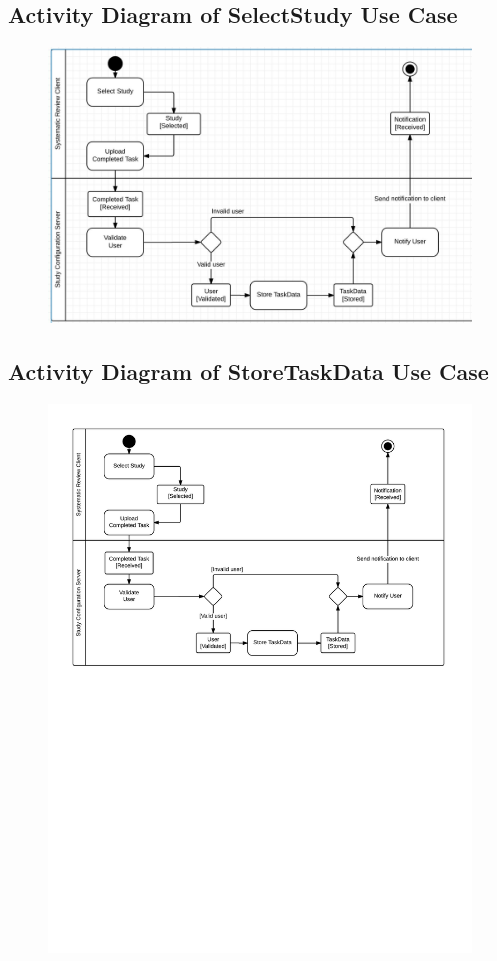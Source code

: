 \subsection{ Activity Diagram of SelectStudy Use Case}
\begin{figure}[H]
  \includegraphics[width=45em]{section/DynamicModel/Activity_Diagram_Select_Study}
  \label{fig: Activity Diagram of SelectStudy Use Case}
\end{figure}

\subsection{ Activity Diagram of StoreTaskData Use Case}
\begin{figure}[H]
  \includegraphics[width=45em]{section/DynamicModel/Activity_Diagram_StoreTaskData}
  \label{fig: Activity Diagram of StoreTaskData Use Case}
\end{figure}

